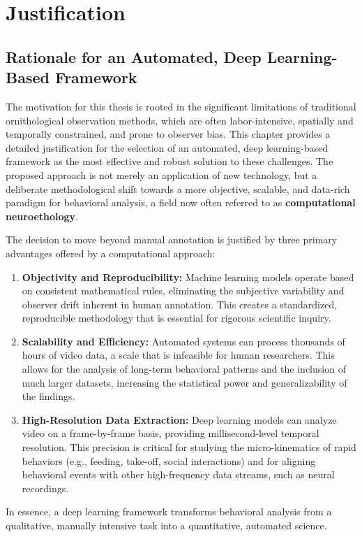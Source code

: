 
\chapter*{Justification}
\thispagestyle{empty}

\section{Rationale for an Automated, Deep Learning-Based Framework}

The motivation for this thesis is rooted in the significant limitations of traditional ornithological observation methods, which are often labor-intensive, spatially and temporally constrained, and prone to observer bias. This chapter provides a detailed justification for the selection of an automated, deep learning-based framework as the most effective and robust solution to these challenges. The proposed approach is not merely an application of new technology, but a deliberate methodological shift towards a more objective, scalable, and data-rich paradigm for behavioral analysis, a field now often referred to as \textbf{computational neuroethology}.

The decision to move beyond manual annotation is justified by three primary advantages offered by a computational approach:
\begin{enumerate}
    \item \textbf{Objectivity and Reproducibility:} Machine learning models operate based on consistent mathematical rules, eliminating the subjective variability and observer drift inherent in human annotation. This creates a standardized, reproducible methodology that is essential for rigorous scientific inquiry.
    \item \textbf{Scalability and Efficiency:} Automated systems can process thousands of hours of video data, a scale that is infeasible for human researchers. This allows for the analysis of long-term behavioral patterns and the inclusion of much larger datasets, increasing the statistical power and generalizability of the findings.
    \item \textbf{High-Resolution Data Extraction:} Deep learning models can analyze video on a frame-by-frame basis, providing millisecond-level temporal resolution. This precision is critical for studying the micro-kinematics of rapid behaviors (e.g., feeding, take-off, social interactions) and for aligning behavioral events with other high-frequency data streams, such as neural recordings.
\end{enumerate}
In essence, a deep learning framework transforms behavioral analysis from a qualitative, manually intensive task into a quantitative, automated science.

